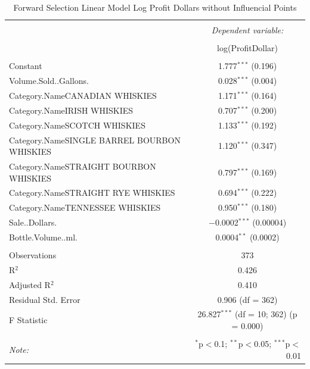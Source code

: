 \documentclass[]{elsarticle} %
\begin{document}
\begin{table}[!htbp] \centering 
  \caption{Forward Selection Linear Model Log Profit Dollars without Influencial Points} 
  \label{} 
\normalsize 
\begin{tabular}{@{\extracolsep{5pt}}lc} 
\\[-1.8ex]\hline 
\hline \\[-1.8ex] 
 & \multicolumn{1}{c}{\textit{Dependent variable:}} \\ 
\cline{2-2} 
\\[-1.8ex] & log(ProfitDollar) \\ 
\hline \\[-1.8ex] 
 Constant & 1.777$^{***}$ (0.196) \\ 
  Volume.Sold..Gallons. & 0.028$^{***}$ (0.004) \\ 
  Category.NameCANADIAN WHISKIES & 1.171$^{***}$ (0.164) \\ 
  Category.NameIRISH WHISKIES & 0.707$^{***}$ (0.200) \\ 
  Category.NameSCOTCH WHISKIES & 1.133$^{***}$ (0.192) \\ 
  Category.NameSINGLE BARREL BOURBON WHISKIES & 1.120$^{***}$ (0.347) \\ 
  Category.NameSTRAIGHT BOURBON WHISKIES & 0.797$^{***}$ (0.169) \\ 
  Category.NameSTRAIGHT RYE WHISKIES & 0.694$^{***}$ (0.222) \\ 
  Category.NameTENNESSEE WHISKIES & 0.950$^{***}$ (0.180) \\ 
  Sale..Dollars. & $-$0.0002$^{***}$ (0.00004) \\ 
  Bottle.Volume..ml. & 0.0004$^{**}$ (0.0002) \\ 
 \hline \\[-1.8ex] 
Observations & 373 \\ 
R$^{2}$ & 0.426 \\ 
Adjusted R$^{2}$ & 0.410 \\ 
Residual Std. Error & 0.906 (df = 362) \\ 
F Statistic & 26.827$^{***}$ (df = 10; 362)  (p = 0.000) \\ 
\hline 
\hline \\[-1.8ex] 
\textit{Note:}  & \multicolumn{1}{r}{$^{*}$p$<$0.1; $^{**}$p$<$0.05; $^{***}$p$<$0.01} \\ 
\end{tabular} 
\end{table}
\end{document}
